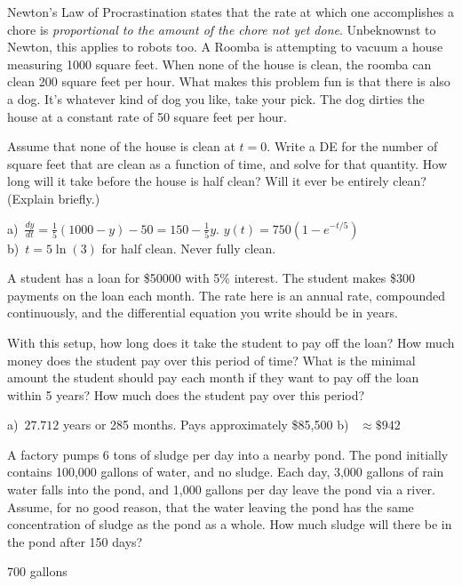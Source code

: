 \begin{exercise}
Newton's Law of Procrastination states that the rate at which one accomplishes a chore is {\it proportional to the amount of the chore not yet done}. Unbeknownst to Newton, this applies to robots too. A Roomba is attempting to vacuum a house measuring 1000 square feet. When none of the house is clean, the roomba can clean 200 square feet per hour. What makes this problem fun is that there is also a dog. It's whatever kind of dog you like, take your pick. The dog dirties the house at a constant rate of 50 square feet per hour.
\begin{tasks}
\task Assume that none of the house is clean at $t=0$. Write a DE for  the number of square feet that are clean as a function of time, and solve for that quantity.
\task How long will it take before the house is half clean? Will it ever be entirely clean? (Explain briefly.)
\end{tasks}
\end{exercise}
\comboSol{%
}
{%
a)~$\frac{dy}{dt} = \frac{1}{5}(1000 - y) - 50 = 150 - \frac{1}{5}y$. $y(t) = 750(1-e^{-t/5})$ \\
b)~$t = 5\ln(3)$ for half clean. Never fully clean.
}

\begin{exercise}
A student has a loan for \$50000 with 5\% interest. The student makes \$300 payments on the loan each month. The rate here is an annual rate, compounded continuously, and the differential equation you write should be in years.
\begin{tasks}
\task With this setup, how long does it take the student to pay off the loan? How much money does the student pay over this period of time?
\task What is the minimal amount the student should pay each month if they want to pay off the loan within 5 years? How much does the student pay over this period?
\end{tasks}
\end{exercise}
\comboSol{%
}
{%
a)~$27.712$ years or 285 months. Pays approximately \$85,500 \quad b)~ $\approx \$942$
}

\begin{exercise}
A factory pumps 6 tons of sludge per day into a nearby pond. The pond initially contains 100,000 gallons of water, and no sludge. Each day, 3,000 gallons of rain water falls into the pond, and 1,000 gallons per day leave the pond via a river. Assume, for no good reason, that the water leaving the pond has the same concentration of sludge as the pond as a whole. How much sludge will there be in the pond after 150 days? %
\end{exercise}
\comboSol{%
}
{%
700 gallons
}

